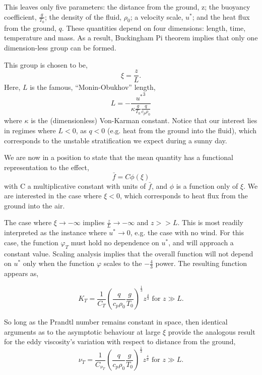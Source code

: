 This leaves only five parameters: the distance from the ground, z; the
buoyancy coefficient, $\frac{g}{T_0}$; the density of the fluid,
$\rho_0$; a velocity scale, $u^*$; and the heat flux from the ground,
$q$. 
%
% 
These quantities depend on
four dimensions: length, time, temperature and mass. As a result,
Buckingham Pi theorem implies that only one dimension-less group can be
formed\cite{}.%

This group is chosen to be,
\begin{equation}
 \xi = \frac{z}{L}.
\end{equation}
Here, $L$ is the famous, ``Monin-Obukhov'' length,
\begin{equation}
 L = -\frac{{u^*}^3}{\kappa \frac{g}{T_0} \frac{q}{c_p \rho_0}}
\end{equation}
where $\kappa$ is the (dimensionless) Von-Karman constant. Notice that
our interest lies in regimes where $L<0$, as $q<0$ (e.g. heat from the
ground into the fluid), which corresponds to the unstable stratification 
we expect during a sunny day. 

We are now in a position to state that the mean quantity has a
functional representation to the effect,
\begin{equation}
 \bar f = C \phi(\xi)
\end{equation}
with C a multiplicative constant with units of $\bar f$, and $\phi$ is a
function only of $\xi$. We are interested in the case where $\xi<0$, which
corresponds to heat flux from the ground into the air.  

The case where $\xi \to -\infty $ implies $\frac{z}{L} \to
-\infty $ and $z>>L$. This is most readily interpreted as the instance
where $u^* \to 0$, e.g. the case with no wind. For this case, the
function $\varphi_T$ must hold no dependence on $u^*$, and will approach
a constant value. Scaling analysis implies that the overall function
will not depend on $u^*$ only when the function $\varphi$ scales to the
$-\frac{4}{3}$ power. The resulting function appears as, 

\begin{equation}
 K_T = \frac{1}{C_T} \left( \frac{q}{c_p \rho_0} \frac{g}{T_0}
		     \right)^\frac{1}{3} z^{\frac{4}{3}}  \text{ 
for } z \gg L. 
\end{equation}

So long as the Prandtl number remains constant in space\cite{}, then
identical arguments as to the asymptotic behaviour at large $\xi$ provide
the analogous result for the eddy viscosity's variation with respect to
distance from the ground,  
\begin{equation}
 \nu_T = \frac{1}{C_{\nu_T}} \left( \frac{q}{c_p \rho_0} \frac{g}{T_0}
			     \right)^\frac{1}{3} z^{\frac{4}{3}}  \text{ 
for } z \gg L. 
\end{equation}

